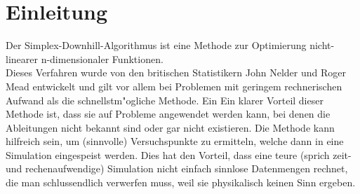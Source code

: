 \section{Einleitung}
Der Simplex-Downhill-Algorithmus ist eine Methode zur Optimierung nicht-linearer n-dimensionaler Funktionen. \\
Dieses Verfahren wurde von den britischen Statistikern John Nelder und Roger Mead entwickelt und gilt vor allem bei Problemen mit geringem rechnerischen Aufwand als die schnellstm"ogliche Methode. Ein Ein klarer Vorteil dieser Methode ist, dass sie auf Probleme angewendet werden kann, bei denen  die Ableitungen nicht bekannt sind oder gar nicht existieren. Die Methode kann hilfreich sein, um (sinnvolle) Versuchspunkte zu ermitteln, welche dann in eine Simulation eingespeist werden. Dies hat den Vorteil, dass eine teure (sprich zeit- und rechenaufwendige) Simulation nicht einfach sinnlose Datenmengen rechnet, die man schlussendlich verwerfen muss, weil sie physikalisch keinen Sinn ergeben.  
